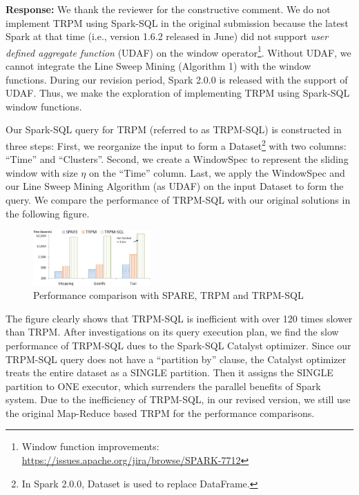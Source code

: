 \documentclass{vldb}
\begin{document}
\textbf{Response:} We thank the reviewer for the constructive comment.
We do not implement TRPM using Spark-SQL in the original submission 
because the latest Spark at that time (i.e., version 1.6.2 released in June)
did not support \textit{user defined aggregate function} (UDAF) on the window operator\footnote{Window function improvements: \url{https://issues.apache.org/jira/browse/SPARK-7712}}. 
Without UDAF, we cannot integrate the Line Sweep Mining (Algorithm 1) with the window functions. 
During our revision period, Spark 2.0.0 is released with the support of UDAF. Thus, we make the exploration of implementing TRPM using Spark-SQL window functions.

Our Spark-SQL query for TRPM (referred to as TRPM-SQL) is constructed in three steps:
First, we reorganize the input to form a Dataset\footnote{In Spark 2.0.0, Dataset is used to replace DataFrame.} with two columns: ``Time'' and ``Clusters''. 
Second, we create a WindowSpec to represent the sliding window with size $\eta$ on the ``Time'' column.
Last, we apply the WindowSpec and our Line Sweep Mining Algorithm (as UDAF) on the input Dataset to
form the query.
We compare the performance of TRPM-SQL with our original solutions in the following figure.
%

\begin{figure}[h]
\centering
\includegraphics[width=0.4\textwidth]{spark-sql-comp.eps}
\caption{Performance comparison with SPARE, TRPM and TRPM-SQL}
\end{figure}

The figure clearly shows that TRPM-SQL is inefficient with over
120 times slower than TRPM. After investigations on its query execution
plan, we find the slow performance of TRPM-SQL dues to the Spark-SQL Catalyst optimizer.
Since our TRPM-SQL query does not have a ``partition by'' clause, the Catalyst optimizer
treats the entire dataset as a SINGLE partition. Then it assigns the SINGLE partition to ONE executor,
which surrenders the parallel benefits of Spark system.
Due to the inefficiency of TRPM-SQL, in our revised version, we
still use the original Map-Reduce based TRPM for the performance comparisons.
\end{document}
